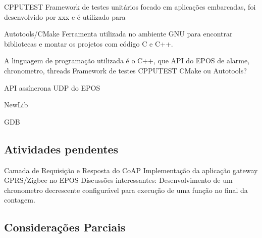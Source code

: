CPPUTEST
Framework de testes unitários focado em aplicações embarcadas, foi desenvolvido por xxx e é utilizado para 

Autotools/CMake
Ferramenta utilizada no ambiente GNU para encontrar bibliotecas e montar os projetos com código C e C++.

A linguagem de programação utilizada é o C++, que API do EPOS de alarme, chronometro, threads
Framework de testes CPPUTEST CMake ou Autotools?

API assíncrona UDP do EPOS

NewLib

GDB

\subsection{Atividades pendentes}
Camada de Requisição e Resposta do CoAP
Implementação da aplicação gateway GPRS/Zigbee no EPOS
Discussões interessantes:
Desenvolvimento de um chronometro decrescente configurável para execução de uma função no final da contagem.


\subsection{Considerações Parciais}
